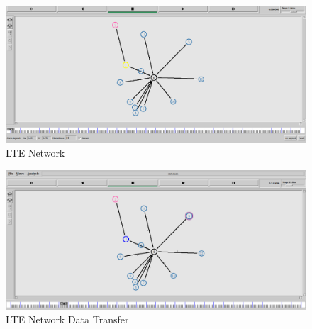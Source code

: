 
    
     \begin{figure}[!h]
        \centering
        \includegraphics[width=.9\textwidth]{Pictures/LTE/LTE-1.png}
        \caption{LTE Network}
    \end{figure}
    
    \begin{figure}[!h]
        \centering
        \includegraphics[width=.9\textwidth]{Pictures/LTE/LTE-2.png}
        \caption{LTE Network Data Transfer}
    \end{figure}